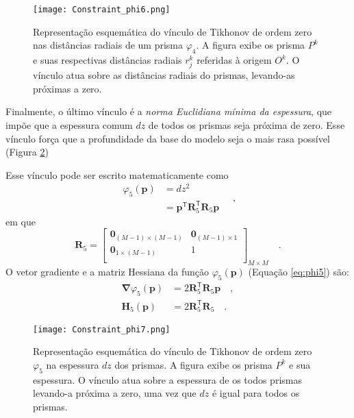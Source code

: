 \begin{figure}[!htb]
	\centering
	\texttt{[image: Constraint\_phi6.png]}
	\caption{Representação esquemática do vínculo de Tikhonov de ordem zero nas distâncias radiais de um prisma $\varphi_{4}$. A figura exibe os prisma $P^k$ e suas respectivas distâncias radiais $r_j^k$ referidas à origem $O^k$. O vínculo atua sobre as distâncias radiais do prismas, levando-as próximas a zero.}
	\label{fig:phi4}
\end{figure}

Finalmente, o último vínculo é a \textit{norma Euclidiana mínima da espessura}, que impõe que a espessura comum $ dz $ de todos os prismas seja próxima de zero. Esse vínculo força que a profundidade da base do modelo seja o mais rasa possível (Figura \ref{fig:phi5})

Esse vínculo pode ser escrito matematicamente como
\begin{equation}\label{eq:phi5}
\begin{split}
\varphi_{5}(\mathbf{p}) &= dz^2 \\
&= \mathbf{p}^{\mathsf{T}} \mathbf{R}_{5}^{\mathsf{T}} \mathbf{R}_{5} \mathbf{p}
\end{split} \quad ,
\end{equation}
em que
\begin{equation}
\mathbf{R}_{5} =
\begin{bmatrix}
\mathbf{0}_{(M-1) \times (M-1)} & \mathbf{0}_{(M-1) \times 1} \\
\mathbf{0}_{1 \times (M-1)} & 1 \\
\end{bmatrix}_{ M \times M } \quad .
\end{equation}
O vetor gradiente e a matriz Hessiana da função $\varphi_{5}(\mathbf{p})$ (Equação \ref{eq:phi5}) são:
\begin{equation}\label{eq:phi5_gh}
\begin{split}
\boldsymbol{\nabla}\varphi_{5}(\mathbf{p}) &= 2\mathbf{R}^\mathsf{T}_{5}\mathbf{R}_{5}\mathbf{p} \quad ,\\
\mathbf{H}_{5}(\mathbf{p}) &= 2\mathbf{R}^\mathsf{T}_{5}\mathbf{R}_{5} \quad .
\end{split}
\end{equation}

\begin{figure}[!htb]
	\centering
	\texttt{[image: Constraint\_phi7.png]}
	\caption{Representação esquemática do vínculo de Tikhonov de ordem zero $\varphi_{5}$ na espessura $dz$ dos prismas. A figura exibe os prisma $P^k$ e sua espessura. O vínculo atua sobre a espessura de os todos prismas levando-a próxima a zero, uma vez que $dz$ é igual para todos os prismas.}
	\label{fig:phi5}
\end{figure}

